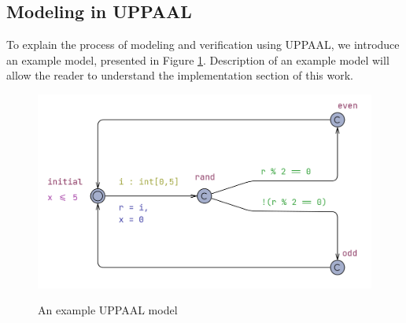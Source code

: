 \subsection{Modeling in UPPAAL}
To explain the process of modeling and verification using UPPAAL, we introduce an example model, presented in Figure \ref{fig:automaton_example}. Description of an example model will allow the reader to understand the implementation section of this work.
\begin{figure}[H]
\caption{An example UPPAAL model}
\includegraphics[width=\textwidth]{images/automaton_example.png}
\label{fig:automaton_example}
\end{figure}
\noindent
